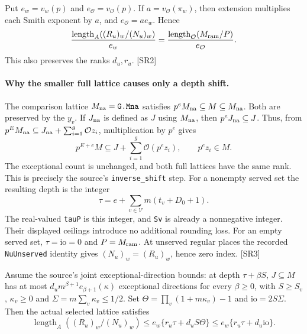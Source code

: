 Put $e_w=v_w(p)$ and $e_{\mathcal O}=v_{\mathcal O}(p)$.
If $a=v_{\mathcal O}(\pi_w)$, then extension multiplies each Smith
exponent by $a$, and $e_{\mathcal O}=ae_w$. Hence
\begin{equation}\label{eq:sr-length-transport}
 \frac{\operatorname{length}_{A}((R_u)_w/(N_u)_w)}{e_w}
 =\frac{\operatorname{length}_{\mathcal O}(M_{\rm ram}/P)}{e_{\mathcal O}}.
\end{equation}
This also preserves the ranks $d_u,r_u$. \textsf{[SR2]}

\paragraph{Why the smaller full lattice causes only a depth shift.}
The comparison lattice $M_{\rm na}=\texttt{G.Mna}$ satisfies
$p^eM_{\rm na}\subseteq M\subseteq M_{\rm na}$.
Both are preserved by the $y_v$. If $J_{\rm na}$ is defined as $J$ using
$M_{\rm na}$, then $p^eJ_{\rm na}\subseteq J$.
Thus, from
$p^EM_{\rm na}\subseteq J_{\rm na}+\sum_{i=1}^g\mathcal O z_i$,
multiplication by $p^e$ gives
\[
 p^{E+e}M\subseteq J+\sum_{i=1}^g\mathcal O(p^ez_i),
 \qquad p^ez_i\in M.
\]
The exceptional count is unchanged, and both full lattices have the same
rank. This is precisely the source's \texttt{inverse\_shift} step.
For a nonempty served set the resulting depth is the integer
\[
 \tau=e+\sum_{v\in\mathcal V}m(t_v+D_0+1).
\]
The real-valued \texttt{tauP} is this integer, and \texttt{Sv} is already
a nonnegative integer. Their displayed ceilings introduce no additional
rounding loss. For an empty served set, $\tau=\mathrm{io}=0$ and
$P=M_{\rm ram}$. At unserved regular places the recorded
\texttt{NuUnserved} identity gives $(N_u)_w=(R_u)_w$, hence zero index.
\textsf{[SR3]}

\begin{proposition}\label{prop:sr-actual-index}
Assume the source's joint exceptional-direction bounds: at depth
$\tau+\beta S$, $J\subseteq M$ has at most
$d_u m^{\beta+1}e_{\beta+1}(\kappa)$ exceptional directions for every
$\beta\ge0$, with $S\ge S_v$, $\kappa_v\ge0$ and
$\Sigma=m\sum_v\kappa_v\le1/2$.
Set $\Theta=\prod_v(1+m\kappa_v)-1$ and $\mathrm{io}=2S\Sigma$.
Then the actual selected lattice satisfies
\begin{equation}\label{eq:sr-index}
 \operatorname{length}_{A}((R_u)_w/(N_u)_w)
 \le e_w\{r_u\tau+d_uS\Theta\}
 \le e_w\{r_u\tau+d_u\mathrm{io}\}.
\end{equation}
\end{proposition}

